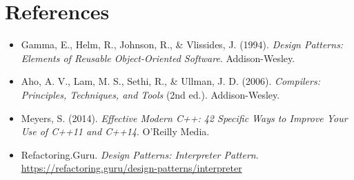 \documentclass[12pt,a4paper]{article}
\begin{document}
\newpage

\section*{References}
\begin{itemize}
    \item Gamma, E., Helm, R., Johnson, R., \& Vlissides, J. (1994). \textit{Design Patterns: Elements of Reusable Object-Oriented Software}. Addison-Wesley.
    \item Aho, A. V., Lam, M. S., Sethi, R., \& Ullman, J. D. (2006). \textit{Compilers: Principles, Techniques, and Tools} (2nd ed.). Addison-Wesley.
    \item Meyers, S. (2014). \textit{Effective Modern C++: 42 Specific Ways to Improve Your Use of C++11 and C++14}. O'Reilly Media.
    \item Refactoring.Guru. \textit{Design Patterns: Interpreter Pattern}. \url{https://refactoring.guru/design-patterns/interpreter}
\end{itemize}
\end{document}
